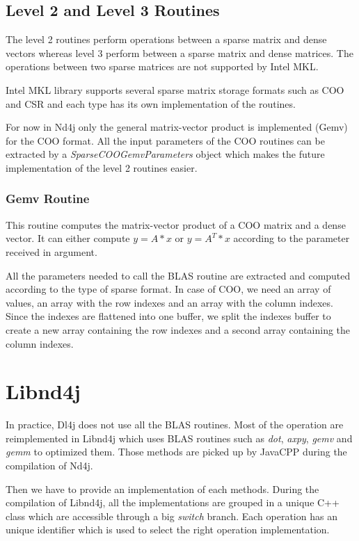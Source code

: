 \subsection{Level 2 and Level 3 Routines}

The level 2 routines perform operations between a sparse matrix and dense vectors whereas level 3 perform between a sparse matrix and dense matrices. The operations between two sparse matrices are not supported by Intel MKL.

Intel MKL library \cite{mkllvl23} supports several sparse matrix storage formats such as COO and CSR and each type has its own implementation of the routines.

For now in Nd4j only the general matrix-vector product is implemented (Gemv) for the COO format. All the input parameters of the COO routines can be extracted by a \textit{SparseCOOGemvParameters} object which makes the future implementation of the level 2 routines easier.

\subsubsection{Gemv Routine}
This routine computes the matrix-vector product of a COO matrix and a dense vector. It can either compute $y = A*x$ or $y = A^{T}*x$ according to the parameter received in argument.

All the parameters needed to call the BLAS routine are extracted and computed according to the type of sparse format.
In case of COO, we need an array of values, an array with the row indexes and an array with the column indexes. Since the indexes are flattened into one buffer, we split the indexes buffer to create a new array containing the row indexes and a second array containing the column indexes.

\section{Libnd4j}

In practice, Dl4j does not use all the BLAS routines. Most of the operation are reimplemented in Libnd4j which uses BLAS routines such as \textit{dot}, \textit{axpy}, \textit{gemv} and \textit{gemm} to optimized them.  Those methods are picked up by JavaCPP during the compilation of Nd4j.

Then we have to provide an implementation of each methods. During the compilation of Libnd4j, all the implementations are grouped in a unique C++ class which are accessible through a big \textit{switch} branch. Each operation has an unique identifier which is used to select the right operation implementation.
